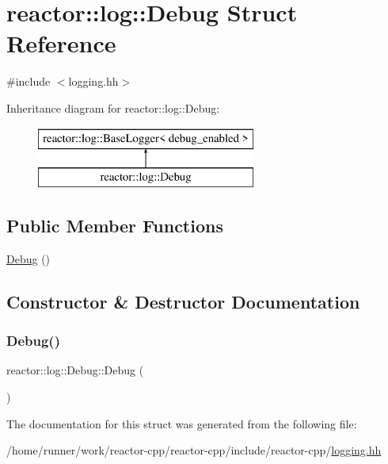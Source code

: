 \hypertarget{structreactor_1_1log_1_1Debug}{}\section{reactor\+:\+:log\+:\+:Debug Struct Reference}
\label{structreactor_1_1log_1_1Debug}


{\ttfamily \#include $<$logging.\+hh$>$}

Inheritance diagram for reactor\+:\+:log\+:\+:Debug\+:\begin{figure}[H]
\begin{center}
\leavevmode
\includegraphics[height=2.000000cm]{structreactor_1_1log_1_1Debug}
\end{center}
\end{figure}
\subsection*{Public Member Functions}
\begin{DoxyCompactItemize}
\item 
\hyperlink{structreactor_1_1log_1_1Debug_a7675a74aaae5b2c062dfd88840b7c1ac}{Debug} ()
\end{DoxyCompactItemize}


\subsection{Constructor \& Destructor Documentation}
\mbox{\label{structreactor_1_1log_1_1Debug_a7675a74aaae5b2c062dfd88840b7c1ac}} 
\subsubsection{\texorpdfstring{Debug()}{Debug()}}
{\footnotesize\ttfamily reactor\+::log\+::\+Debug\+::\+Debug (\begin{DoxyParamCaption}{ }\end{DoxyParamCaption})\hspace{0.3cm}{\ttfamily [inline]}}



The documentation for this struct was generated from the following file\+:\begin{DoxyCompactItemize}
\item 
/home/runner/work/reactor-\/cpp/reactor-\/cpp/include/reactor-\/cpp/\hyperlink{logging_8hh}{logging.\+hh}\end{DoxyCompactItemize}
